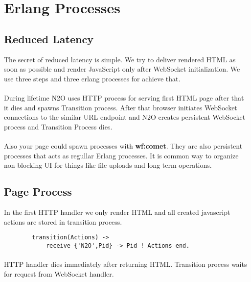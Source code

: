 \section{Erlang Processes}

\subsection{Reduced Latency}
The secret of reduced latency is simple. We try to deliver rendered HTML
as soon as possible and render JavaScript only after WebSocket initialization.
We use three steps and three erlang processes for achieve that.


\paragraph{}
During lifetime N2O uses HTTP process for serving first HTML page after that it dies
and spawns Transition process. After that browser initiates WebSocket connections
to the similar URL endpoint and N2O creates persistent WebSocket process and
Transition Process dies.

\paragraph{}
Also your page could spawn processes with {\bf wf:comet}. They are also persistent
processes that acts as regullar Erlang processes. It is common way to organize
non-blocking UI for things like file uploads and long-term operations.

\subsection{Page Process}
In the first HTTP handler we only render HTML and all created
javascript actions are stored in transition process.

\vspace{1\baselineskip}
\begin{lstlisting}
        transition(Actions) ->
            receive {'N2O',Pid} -> Pid ! Actions end.
\end{lstlisting}

\paragraph{}
HTTP handler dies immediately after returning HTML. Transition process
waits for request from WebSocket handler.

